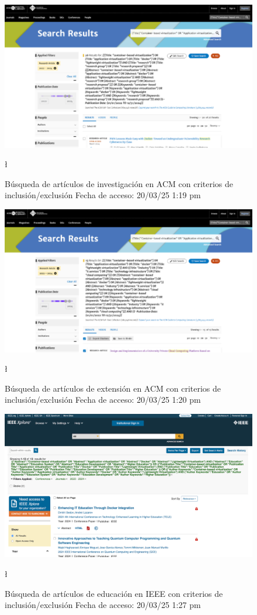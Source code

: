 \FloatBarrier\begin{figure}[H]
    \centering
    \includegraphics[width=\textwidth,keepaspectratio]{apendices/BD/criterios/ACM-inv.png}
    \caption{Búsqueda de artículos de investigación en ACM con criterios de inclusión/exclusión
    Fecha de acceso: 20/03/25 1:19 pm
    }\l
\end{figure}
\FloatBarrier\begin{figure}[H]
    \centering
    \includegraphics[width=\textwidth,keepaspectratio]{apendices/BD/criterios/ACM-ind.png}
    \caption{Búsqueda de artículos de extensión en ACM con criterios de inclusión/exclusión
    Fecha de acceso: 20/03/25 1:20 pm
    }\l
\end{figure}
\FloatBarrier\begin{figure}[H]
    \centering
    \includegraphics[width=\textwidth,keepaspectratio]{apendices/BD/criterios/IEEE-ed.png}
    \caption{Búsqueda de artículos de educación en IEEE con criterios de inclusión/exclusión
    Fecha de acceso: 20/03/25 1:27 pm
    }\l
\end{figure}
